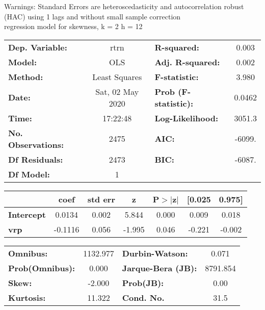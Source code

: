 Warnings: \newline
 [1] Standard Errors are heteroscedasticity and autocorrelation robust (HAC) using 1 lags and without small sample correction\\ 

regression model for skewness, k = 2 h = 12\begin{center}
\begin{tabular}{lclc}
\toprule
\textbf{Dep. Variable:}    &       rtrn       & \textbf{  R-squared:         } &     0.003   \\
\textbf{Model:}            &       OLS        & \textbf{  Adj. R-squared:    } &     0.002   \\
\textbf{Method:}           &  Least Squares   & \textbf{  F-statistic:       } &     3.980   \\
\textbf{Date:}             & Sat, 02 May 2020 & \textbf{  Prob (F-statistic):} &   0.0462    \\
\textbf{Time:}             &     17:22:48     & \textbf{  Log-Likelihood:    } &    3051.3   \\
\textbf{No. Observations:} &        2475      & \textbf{  AIC:               } &    -6099.   \\
\textbf{Df Residuals:}     &        2473      & \textbf{  BIC:               } &    -6087.   \\
\textbf{Df Model:}         &           1      & \textbf{                     } &             \\
\bottomrule
\end{tabular}
\begin{tabular}{lcccccc}
                   & \textbf{coef} & \textbf{std err} & \textbf{z} & \textbf{P$> |$z$|$} & \textbf{[0.025} & \textbf{0.975]}  \\
\midrule
\textbf{Intercept} &       0.0134  &        0.002     &     5.844  &         0.000        &        0.009    &        0.018     \\
\textbf{vrp}       &      -0.1116  &        0.056     &    -1.995  &         0.046        &       -0.221    &       -0.002     \\
\bottomrule
\end{tabular}
\begin{tabular}{lclc}
\textbf{Omnibus:}       & 1132.977 & \textbf{  Durbin-Watson:     } &    0.071  \\
\textbf{Prob(Omnibus):} &   0.000  & \textbf{  Jarque-Bera (JB):  } & 8791.854  \\
\textbf{Skew:}          &  -2.000  & \textbf{  Prob(JB):          } &     0.00  \\
\textbf{Kurtosis:}      &  11.322  & \textbf{  Cond. No.          } &     31.5  \\
\bottomrule
\end{tabular}
\end{center}

